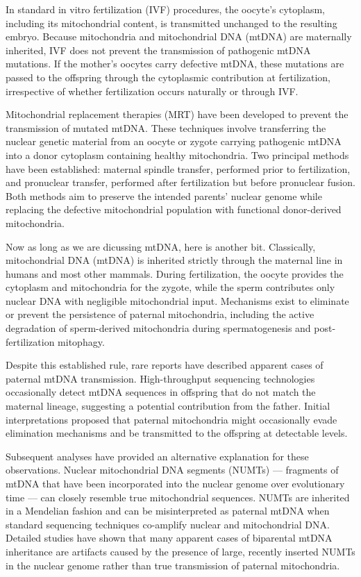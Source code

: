 In standard in vitro fertilization (IVF) procedures, the oocyte’s cytoplasm, including its mitochondrial content, is transmitted unchanged to the resulting embryo. Because mitochondria and mitochondrial DNA (mtDNA) are maternally inherited, IVF does not prevent the transmission of pathogenic mtDNA mutations. If the mother’s oocytes carry defective mtDNA, these mutations are passed to the offspring through the cytoplasmic contribution at fertilization, irrespective of whether fertilization occurs naturally or through IVF.

Mitochondrial replacement therapies (MRT) have been developed to prevent the transmission of mutated mtDNA. These techniques involve transferring the nuclear genetic material from an oocyte or zygote carrying pathogenic mtDNA into a donor cytoplasm containing healthy mitochondria. Two principal methods have been established: maternal spindle transfer, performed prior to fertilization, and pronuclear transfer, performed after fertilization but before pronuclear fusion. Both methods aim to preserve the intended parents' nuclear genome while replacing the defective mitochondrial population with functional donor-derived mitochondria.

Now as long as we are dicussing mtDNA, here is another bit. Classically, mitochondrial DNA (mtDNA) is inherited strictly through the maternal line in humans and most other mammals. During fertilization, the oocyte provides the cytoplasm and mitochondria for the zygote, while the sperm contributes only nuclear DNA with negligible mitochondrial input. Mechanisms exist to eliminate or prevent the persistence of paternal mitochondria, including the active degradation of sperm-derived mitochondria during spermatogenesis and post-fertilization mitophagy.

Despite this established rule, rare reports have described apparent cases of paternal mtDNA transmission. High-throughput sequencing technologies occasionally detect mtDNA sequences in offspring that do not match the maternal lineage, suggesting a potential contribution from the father. Initial interpretations proposed that paternal mitochondria might occasionally evade elimination mechanisms and be transmitted to the offspring at detectable levels.

Subsequent analyses have provided an alternative explanation for these observations. Nuclear mitochondrial DNA segments (NUMTs) — fragments of mtDNA that have been incorporated into the nuclear genome over evolutionary time — can closely resemble true mitochondrial sequences. NUMTs are inherited in a Mendelian fashion and can be misinterpreted as paternal mtDNA when standard sequencing techniques co-amplify nuclear and mitochondrial DNA. Detailed studies have shown that many apparent cases of biparental mtDNA inheritance are artifacts caused by the presence of large, recently inserted NUMTs in the nuclear genome rather than true transmission of paternal mitochondria.


